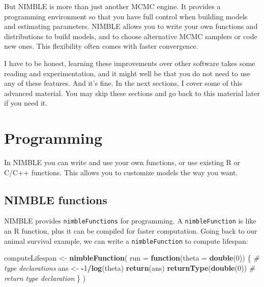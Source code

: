 \documentclass[
  12pt,
]{krantz}
\newenvironment{Shaded}{\begin{snugshade}}{\end{snugshade}}
\newcommand{\AttributeTok}[1]{\textcolor[rgb]{0.13,0.29,0.53}{#1}}
\newcommand{\CommentTok}[1]{\textcolor[rgb]{0.56,0.35,0.01}{\textit{#1}}}
\newcommand{\ControlFlowTok}[1]{\textcolor[rgb]{0.13,0.29,0.53}{\textbf{#1}}}
\newcommand{\DecValTok}[1]{\textcolor[rgb]{0.00,0.00,0.81}{#1}}
\newcommand{\FunctionTok}[1]{\textcolor[rgb]{0.13,0.29,0.53}{\textbf{#1}}}
\newcommand{\NormalTok}[1]{#1}
\newcommand{\OtherTok}[1]{\textcolor[rgb]{0.56,0.35,0.01}{#1}}
\newcommand{\SpecialCharTok}[1]{\textcolor[rgb]{0.81,0.36,0.00}{\textbf{#1}}}
\begin{document}
But NIMBLE is more than just another MCMC engine. It provides a programming environment so that you have full control when building models and estimating parameters. NIMBLE allows you to write your own functions and distributions to build models, and to choose alternative MCMC samplers or code new ones. This flexibility often comes with faster convergence.

I have to be honest, learning these improvements over other software takes some reading and experimentation, and it might well be that you do not need to use any of these features. And it's fine. In the next sections, I cover some of this advanced material. You may skip these sections and go back to this material later if you need it.

\hypertarget{functions-in-nimble}{%
\section{Programming}\label{functions-in-nimble}}

In NIMBLE you can write and use your own functions, or use existing R or C/C++ functions. This allows you to customize models the way you want.

\hypertarget{nimble-functions}{%
\subsection{NIMBLE functions}\label{nimble-functions}}

NIMBLE provides \texttt{nimbleFunctions} for programming. A \texttt{nimbleFunction} is like an R function, plus it can be compiled for faster computation. Going back to our animal survival example, we can write a \texttt{nimbleFunction} to compute lifespan:

\begin{Shaded}
\begin{Highlighting}[]
\NormalTok{computeLifespan }\OtherTok{\textless{}{-}} \FunctionTok{nimbleFunction}\NormalTok{(}
    \AttributeTok{run =} \ControlFlowTok{function}\NormalTok{(}\AttributeTok{theta =} \FunctionTok{double}\NormalTok{(}\DecValTok{0}\NormalTok{)) \{ }\CommentTok{\# type declarations}
\NormalTok{        ans }\OtherTok{\textless{}{-}} \SpecialCharTok{{-}}\DecValTok{1}\SpecialCharTok{/}\FunctionTok{log}\NormalTok{(theta)}
        \FunctionTok{return}\NormalTok{(ans)}
        \FunctionTok{returnType}\NormalTok{(}\FunctionTok{double}\NormalTok{(}\DecValTok{0}\NormalTok{))  }\CommentTok{\# return type declaration}
\NormalTok{    \} )}
\end{Highlighting}
\end{Shaded}
\end{document}
